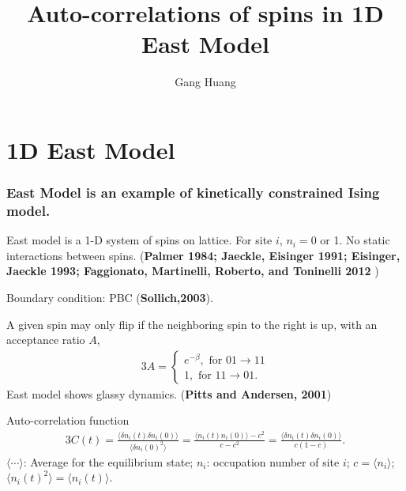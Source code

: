 \documentclass[8pt]{beamer}
\title{Auto-correlations of spins in 1D East Model}
\author{Gang Huang}
\begin{document}
\maketitle

\section{1D East Model}
\begin{frame}
	\frametitle{East Model is an example of kinetically constrained Ising model.} 
	East model is a 1-D system of spins on lattice. For site $i$, $n_i =0$ or 1. 	No static interactions between spins. (\textbf{Palmer 1984; Jaeckle, Eisinger 1991; Eisinger, Jaeckle 1993; Faggionato, Martinelli, Roberto, and Toninelli 2012 })
	
	Boundary condition:  PBC (\textbf{Sollich,2003}). 
	

	
	A given spin may only flip if the neighboring spin to the right is up, with an acceptance ratio $A$,
     \begin{alignat}{3}
       A = \left\{
       \begin{aligned}
	     e^{-\beta}, \text{ for } 01 \to 11 \\
         1, \text{ for } 11 \to 01.
       \end{aligned}
       \right
       .
     \end{alignat}
 East model shows glassy dynamics. (\textbf{Pitts and Andersen, 2001})
 
 Auto-correlation function
      \begin{alignat}{3}
      C(t) = \frac{\langle\delta n_i(t)\delta n_i (0)\rangle}{\langle \delta n_i(0)^2 \rangle} = \frac{\langle n_i(t)n_i(0)\rangle - c^2}{c-c^2} = \frac{\langle\delta n_i(t)\delta n_i (0)\rangle}{c(1-c)}  .
 \end{alignat}
$\langle \cdots \rangle$: Average for the equilibrium state; $n_i$: occupation number of site $i$; $c = \langle n_i \rangle$; $\langle n_i(t)^2 \rangle = \langle n_i(t)\rangle$.
\end{frame}
\end{document}
